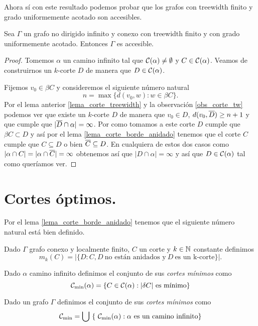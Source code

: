 \documentclass[tesis.tex]{subfiles}
\begin{document}
Ahora sí con este resultado podemos probar que los grafos con treewidth finito y grado uniformemente acotado son accesibles.

\begin{teo}\label{teo_treewidth_fin_accesible}
	Sea $\Gamma$ un grafo no dirigido infinito y conexo con treewidth finito y con grado uniformemente acotado.
	Entonces $\Gamma$ es accesible.
\end{teo}
\begin{proof}
	Tomemos $\alpha$ un camino infinito tal que ${\cal C}(\alpha) \neq \emptyset$ y $C \in {\cal C}(\alpha)$.
	Veamos de construirnos un $k$-corte $D$ de manera que $D \in {\cal C}(\alpha)$.
	
	Fijemos $v_0  \in \beta C$ y consideremos el siguiente número natural
	\[
	n = \max \{ d(v_0,w) : w \in \beta C  \}.
	\]
	Por el lema anterior \ref{lema_corte_treewidth} y la observación \ref{obs_corte_tw} podemos ver que existe un $k$-corte $D$ de manera que $v_{0} \in D$, $d(v_0, \overline D) \ge n+1$ y que cumple que $|\overline D \cap \alpha| = \infty$.
	Por como tomamos a este corte $D$ cumple que $\beta C \subset D$ y así por el lema \ref{lema_corte_borde_anidado} tenemos que el corte $C$ cumple que 
	$C \subseteq D$ o bien $\overline C \subseteq D$.
	En cualquiera de estos dos casos como $|\alpha \cap C| = |\alpha \cap \overline  C| = \infty$ obtenemos así que $|D \cap \alpha|=\infty$ y así que $D \in {\cal C}(\alpha)$ tal como queríamos ver. 
	
\end{proof}


\section{Cortes óptimos.}\label{secc_copt}

Por el lema \ref{lema_corte_borde_anidado} tenemos que el siguiente número natural está bien definido.

\begin{deff}
	Dado $\Gamma$ grafo conexo y localmente finito, $C$ un corte y $k \in \mathbb{N}$ constante definimos
	\[
	m_k(C) = | \{  D : C, D \ \text{no están anidados y} \ D \ \text{es un k-corte}   \} |. 
	\]
\end{deff}

\begin{deff}
	Dado $\alpha$ camino infinito definimos el conjunto de sus \emph{cortes mínimos} como
	\[
	\cam = \{  C \in \ca : |\delta C| \ \text{es mínimo}  \}
	\]
	
	Dado un grafo $\Gamma$ definimos el conjunto de sus \emph{cortes mínimos} como 
	\[
	{\cal C}_{\text{min}} = \bigcup \ \{ \ {\cal C}_{\text{min}}(\alpha) : \alpha \ \text{es un camino infinito}  \}
	\]
\end{deff}
\end{document}

